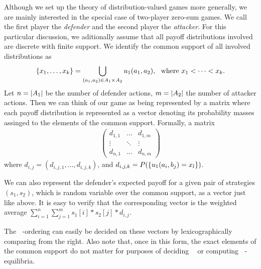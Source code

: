 \documentclass[a4paper]{scrreprt}
\DeclareMathOperator{\leqtail}{\leq_{\text{tail}}}
\begin{document}
    \begin{comm}
        Although we set up the theory of distribution-valued games more generally, we are mainly interested in the special case of two-player zero-sum games.
        We call the first player the \emph{defender} and the second player the \emph{attacker}.
        For this particular discussion, we aditionally assume that all payoff distributions involved are discrete with finite support. We identify the common support of all involved distributions as 
        \begin{equation}
            \{x_1, \dots, x_k\} = \bigcup_{(a_1, a_2) \in A_1 \times A_2} u_1(a_1, a_2),~\text{ where } x_1 < \dots < x_k.
        \end{equation}
        Let $n = \left| A_1 \right|$ be the number of defender actions, $m = \left| A_2 \right|$ the number of attacker actions.
        Then we can think of our game as being represented by a matrix where each payoff distribution is represented as a vector denoting its probability masses assinged to the elements of the common support. Formally, a matrix
        \begin{gather}
                \begin{pmatrix}
                    d_{1,1} & \dots & d_{1,m} \\
                        \vdots & \ddots & \vdots \\                
                    d_{n, 1} & \dots & d_{n,m}
                \end{pmatrix}
        \end{gather}
        where $d_{i,j} = (d_{i,j,1}, \dots, d_{i,j,k})$, and $d_{i,j,k} = P(\{u_1(a_i, b_j) = x_l\})$.
        
        We can also represent the defender's expected payoff for a given pair of strategies $(s_1, s_2)$, which is random variable over the common support, as a vector just like above. It is easy to verify that the corresponding vector is the weighted average $\sum_{i=1}^{n} \sum_{j=1}^{m} s_1[i]*s_2[j]*d_{i,j}$.
        
        The $\leqtail$-ordering can easily be decided on these vectors by lexicographically comparing from the right.
        Also note that, once in this form, the exact elements of the common support do not matter for purposes of deciding $\leqtail$ or computing $\leqtail$-equilibria.
    \end{comm}
    
\end{document}
